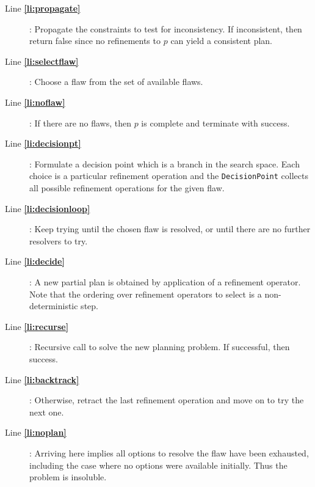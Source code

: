 \begin{description}

\item[Line \textbf{\ref{li:propagate}}]: Propagate the constraints to
  test for inconsistency. If inconsistent, then return false since no
  refinements to $p$ can yield a consistent plan.

\item[Line \textbf{\ref{li:selectflaw}}]: Choose a flaw from the set
  of available flaws.

\item[Line \textbf{\ref{li:noflaw}}]: If there are no flaws, then $p$
  is complete and terminate with success.

\item[Line \textbf{\ref{li:decisionpt}}]: Formulate a decision point
  which is a branch in the search space. Each choice is a particular
  refinement operation and the \texttt{DecisionPoint} collects all
  possible refinement operations for the given flaw.

\item[Line \textbf{\ref{li:decisionloop}}]: Keep trying until the
  chosen flaw is resolved, or until there are no further resolvers to
  try.

\item[Line \textbf{\ref{li:decide}}]: A new partial plan is obtained
  by application of a refinement operator. Note that the ordering over
  refinement operators to select is a non-deterministic step.

\item[Line \textbf{\ref{li:recurse}}]: Recursive call to solve the
  new planning problem. If successful, then success.

\item[Line \textbf{\ref{li:backtrack}}]: Otherwise, retract the last
  refinement operation and move on to try the next one.

\item[Line \textbf{\ref{li:noplan}}]: Arriving here implies all
  options to resolve the flaw have been exhausted, including the case
  where no options were available initially. Thus the problem is
  insoluble.

\end{description}


